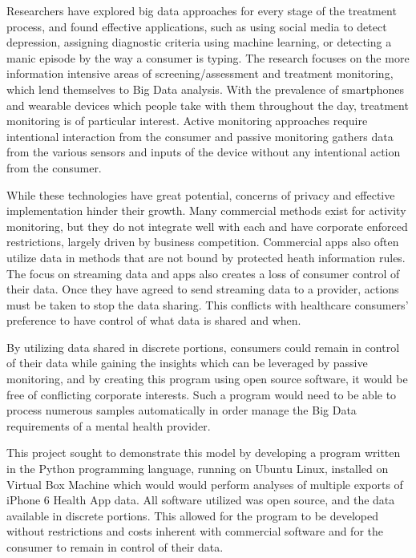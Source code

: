 \documentclass[sigconf]{acmart}
\begin{document}
Researchers have explored big data approaches for every stage of the treatment process, and found effective applications, such as using social media to detect depression, assigning diagnostic criteria using machine learning, or detecting a manic episode by the way a consumer is typing. The research focuses on the more information intensive areas of screening/assessment and treatment monitoring, which lend themselves to Big Data analysis. With the prevalence of smartphones and wearable devices which people take with them throughout the day, treatment monitoring is of particular interest. Active monitoring approaches require intentional interaction from the consumer and passive monitoring gathers data from the various sensors and inputs of the device without any intentional action from the consumer. 

While these technologies have great potential, concerns of privacy and effective implementation hinder their growth. Many commercial methods exist for activity monitoring, but they do not integrate well with each and have corporate enforced restrictions, largely driven by business competition. Commercial apps also often utilize data in methods that are not bound by protected heath information rules. The focus on streaming data and apps also creates a loss of consumer control of their data. Once they have agreed to send streaming data to a provider, actions must be taken to stop the data sharing. This conflicts with healthcare consumers' preference to have control of what data is shared and when. 

By utilizing data shared in discrete portions, consumers could remain in control of their data while gaining the insights which can be leveraged by passive monitoring, and by creating this program using open source software, it would be free of conflicting corporate interests. Such a program would need to be able to process numerous samples automatically in order manage the Big Data requirements of a mental health provider.

This project sought to demonstrate this model by developing a program  written in the Python programming language, running on Ubuntu Linux, installed on Virtual Box Machine which would would perform analyses of multiple exports of iPhone 6 Health App data. All software utilized was open source, and the data available in discrete portions. This allowed for the program to be developed without restrictions and costs inherent with commercial software and for the consumer to remain in control of their data.
\end{document}
